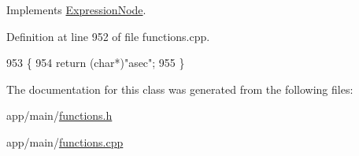 Implements \hyperlink{classExpressionNode_a42a5e9562b0f645a19dcc83f698069b5}{Expression\+Node}.



Definition at line 952 of file functions.\+cpp.


\begin{DoxyCode}
953 \{
954     \textcolor{keywordflow}{return} (\textcolor{keywordtype}{char}*)\textcolor{stringliteral}{"asec"};
955 \}
\end{DoxyCode}


The documentation for this class was generated from the following files\+:\begin{DoxyCompactItemize}
\item 
app/main/\hyperlink{functions_8h}{functions.\+h}\item 
app/main/\hyperlink{functions_8cpp}{functions.\+cpp}\end{DoxyCompactItemize}
